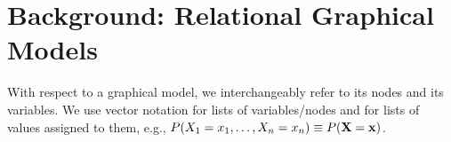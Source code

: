 \documentclass[twoside,leqno,twocolumn]{article}
\begin{document}
%

\section{Background: Relational Graphical Models} 
With respect to a graphical model, we interchangeably refer to its nodes and its variables. We  use vector notation for lists of variables/nodes and for lists of values assigned to them, e.g., $P(X_{1} = x_{1},\ldots,X_{n} = x_{n}) \equiv P(\mathbf{X} = \mathbf{x})$. 
\end{document}
